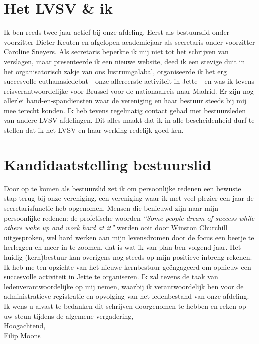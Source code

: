 \documentclass[10pt,a4paper]{article}
\theoremstyle{definition}
\theoremstyle{remark}
\begin{document}
\section*{Het LVSV \& ik}
Ik ben reeds twee jaar actief bij onze afdeling. Eerst als bestuurslid onder voorzitter Dieter Keuten en afgelopen academiejaar als secretaris onder voorzitter Caroline Sneyers. Als secretaris beperkte ik mij niet tot het schrijven van verslagen, maar presenteerde ik een nieuwe website, deed ik een stevige duit in het organisatorisch zakje van ons lustrumgalabal, organiseerde ik het erg succesvolle euthanasiedebat - onze allereerste activiteit in Jette - en was ik tevens reisverantwoordelijke voor Brussel voor de nationaalreis naar Madrid. Er zijn nog allerlei hand-en-spandiensten waar de vereniging en haar bestuur steeds bij mij mee terecht konden. Ik heb tevens regelmatig contact gehad met bestuursleden van andere LVSV afdelingen. Dit alles maakt dat ik in alle bescheidenheid durf te stellen dat ik het LVSV en haar werking redelijk goed ken.

\section*{Kandidaatstelling bestuurslid}
Door op te komen als bestuurslid zet ik om persoonlijke redenen een bewuste stap terug bij onze vereniging, een vereniging waar ik met veel plezier een jaar de secretarisfunctie heb opgenomen. Mensen die benieuwd zijn naar mijn persoonlijke redenen: de profetische woorden \emph{``Some people dream of success while others wake up and work hard at it''} werden ooit door Winston Churchill uitgesproken, wel hard werken aan mijn levensdromen door de focus een beetje te herleggen en meer in te zoomen, dat is wat ik van plan ben volgend jaar. Het huidig (kern)bestuur kan overigens nog steeds op mijn positieve inbreng rekenen. Ik heb me ten opzichte van het nieuwe kernbestuur ge\"{e}ngageerd om opnieuw een succesvolle activiteit in Jette te organiseren. Ik zal tevens de taak van ledenverantwoordelijke op mij nemen, waarbij ik verantwoordelijk ben voor de administratieve registratie en opvolging van het ledenbestand van onze afdeling.\\

\noindent Ik wens u alvast te bedanken dit schrijven doorgenomen te hebben en reken op uw steun tijdens de algemene vergadering,\\

\noindent Hoogachtend,\\

\noindent Filip Moons
\end{document}
